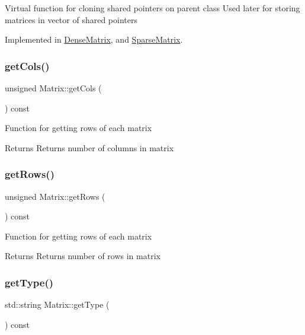 Virtual function for cloning shared pointers on parent class Used later for storing matrices in vector of shared pointers 

Implemented in \mbox{\hyperlink{class_dense_matrix_af6334f6106e2de277daf5affabdca1da}{Dense\+Matrix}}, and \mbox{\hyperlink{class_sparse_matrix_aa130f1050d2fea0a7315e26ccf280433}{Sparse\+Matrix}}.

\mbox{\label{class_matrix_aa716da545a2043ad41ee276806976883}} 
\subsubsection{\texorpdfstring{getCols()}{getCols()}}
{\footnotesize\ttfamily unsigned Matrix\+::get\+Cols (\begin{DoxyParamCaption}{ }\end{DoxyParamCaption}) const}

Function for getting rows of each matrix \begin{DoxyReturn}{Returns}
Returns number of columns in matrix 
\end{DoxyReturn}
\mbox{\label{class_matrix_a9eb68e94c4ac5213e97188d99a21da10}} 
\subsubsection{\texorpdfstring{getRows()}{getRows()}}
{\footnotesize\ttfamily unsigned Matrix\+::get\+Rows (\begin{DoxyParamCaption}{ }\end{DoxyParamCaption}) const}

Function for getting rows of each matrix \begin{DoxyReturn}{Returns}
Returns number of rows in matrix 
\end{DoxyReturn}
\mbox{\label{class_matrix_abc5416c425819f433917650776b86011}} 
\subsubsection{\texorpdfstring{getType()}{getType()}}
{\footnotesize\ttfamily std\+::string Matrix\+::get\+Type (\begin{DoxyParamCaption}{ }\end{DoxyParamCaption}) const}

